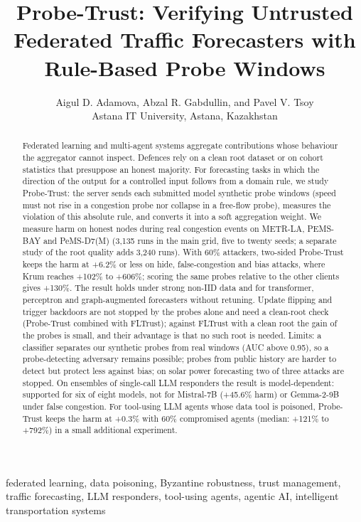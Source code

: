 \documentclass[journal]{IEEEtran}
\begin{document}
\title{Probe-Trust: Verifying Untrusted Federated Traffic Forecasters with Rule-Based Probe Windows}
\author{Aigul D. Adamova, Abzal R. Gabdullin, and Pavel V. Tsoy\\
Astana IT University, Astana, Kazakhstan}
\maketitle
\begin{abstract}
Federated learning and multi-agent systems aggregate contributions whose behaviour the aggregator cannot inspect. Defences rely on a clean root dataset or on cohort statistics that presuppose an honest majority. For forecasting tasks in which the direction of the output for a controlled input follows from a domain rule, we study Probe-Trust: the server sends each submitted model synthetic probe windows (speed must not rise in a congestion probe nor collapse in a free-flow probe), measures the violation of this absolute rule, and converts it into a soft aggregation weight. We measure harm on honest nodes during real congestion events on METR-LA, PEMS-BAY and PeMS-D7(M) (3,135 runs in the main grid, five to twenty seeds; a separate study of the root quality adds 3,240 runs). With 60\% attackers, two-sided Probe-Trust keeps the harm at +6.2\% or less on hide, false-congestion and bias attacks, where Krum reaches +102\% to +606\%; scoring the same probes relative to the other clients gives +130\%. The result holds under strong non-IID data and for transformer, perceptron and graph-augmented forecasters without retuning. Update flipping and trigger backdoors are not stopped by the probes alone and need a clean-root check (Probe-Trust combined with FLTrust); against FLTrust with a clean root the gain of the probes is small, and their advantage is that no such root is needed. Limits: a classifier separates our synthetic probes from real windows (AUC above 0.95), so a probe-detecting adversary remains possible; probes from public history are harder to detect but protect less against bias; on solar power forecasting two of three attacks are stopped. On ensembles of single-call LLM responders the result is model-dependent: supported for six of eight models, not for Mistral-7B (+45.6\% harm) or Gemma-2-9B under false congestion. For tool-using LLM agents whose data tool is poisoned, Probe-Trust keeps the harm at +0.3\% with 60\% compromised agents (median: +121\% to +792\%) in a small additional experiment.
\end{abstract}
\begin{IEEEkeywords}
federated learning, data poisoning, Byzantine robustness, trust management, traffic forecasting, LLM responders, tool-using agents, agentic AI, intelligent transportation systems
\end{IEEEkeywords}
\end{document}
